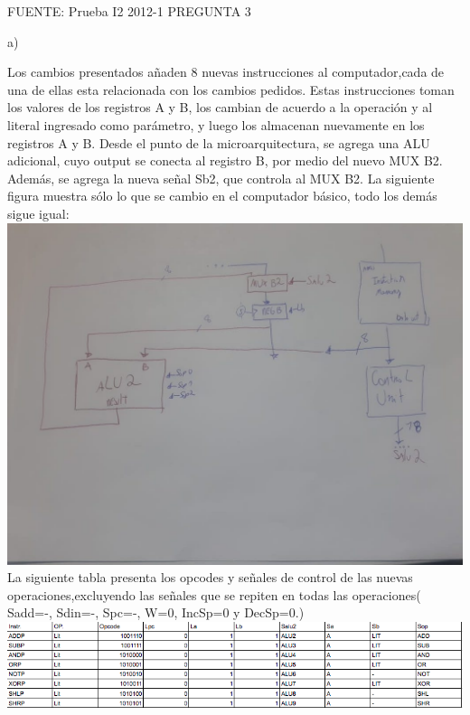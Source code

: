 \documentclass[letter]{article}
\begin{document}
	\begin{pregunta}{5}

	
	
	FUENTE: Prueba I2 2012-1 PREGUNTA 3
	
	$$ $$
		a)
	
	Los cambios presentados añaden 8 nuevas instrucciones al computador,cada de una de ellas esta relacionada con los cambios pedidos. Estas instrucciones toman los valores de los registros A y B, los cambian de acuerdo a la operación y al literal ingresado como parámetro, y luego los almacenan nuevamente en los registros A y B. Desde el punto de la microarquitectura, se agrega una ALU adicional, cuyo output se conecta al registro B, por medio del nuevo MUX B2. Además, se agrega la nueva señal Sb2, que controla al MUX B2.
La siguiente figura muestra sólo lo que se cambio en el computador básico, todo los demás sigue igual:
	$$ $$
	 {\includegraphics[width=15cm]{p1.jpeg}}
	$$ $$
La siguiente tabla presenta los opcodes y señales de control de las nuevas operaciones,excluyendo las señales que se repiten en todas las operaciones( Sadd=-, Sdin=-, Spc=-, W=0, IncSp=0 y DecSp=0.)
$$ $$
{\includegraphics[width=15cm]{tabla2.png}}
	\end{pregunta}
\end{document}
